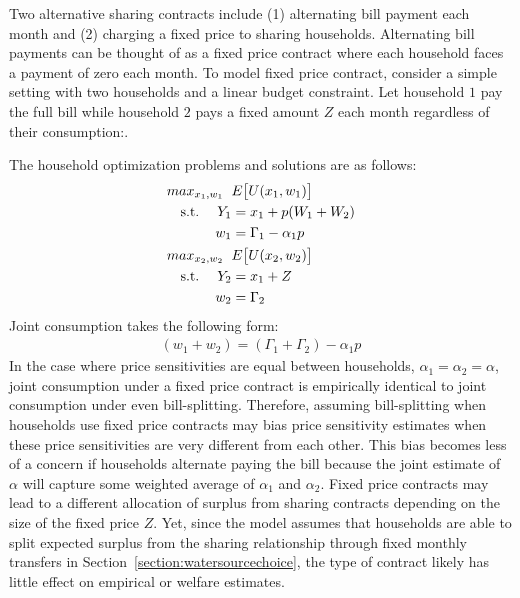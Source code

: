 \documentclass[12pt]{article}
\begin{document}
\begin{appendices}
Two alternative sharing contracts include (1) alternating bill payment each month and (2) charging a fixed price to sharing households.  Alternating bill payments can be thought of as a fixed price contract where each household faces a payment of zero each month.  To model fixed price contract, consider a simple setting with two households and a linear budget constraint.  Let household $1$ pay the full bill while household $2$ pays a fixed amount $Z$ each month regardless of their consumption:.

The household optimization problems and solutions are as follows:
\begin{align*}
max_{x_1,w_1} \hspace{.2cm} & E\big[ U(x_1,w_1) \big] \\
\text{s.t.  }\hspace{.3cm} Y_1 &=   x_1  + p (W_1 + W_{2})  \\
w_1 &= \Gamma_1 - \alpha_1  p \\
max_{x_2,w_2} \hspace{.2cm} & E\big[ U(x_2,w_2) \big] \\
\text{s.t.  }\hspace{.3cm} Y_2 &=   x_1  + Z \\
w_2 &= \Gamma_2
\end{align*}
Joint consumption takes the following form:
\begin{align*}
(w_1+w_2) = (\Gamma_1 + \Gamma_2) - \alpha_1 p
\end{align*}
In the case where price sensitivities are equal between households, $\alpha_1=\alpha_2=\alpha$, joint consumption under a fixed price contract is empirically identical to joint consumption under even bill-splitting.  Therefore, assuming bill-splitting when households use fixed price contracts may bias price sensitivity estimates when these price sensitivities are very different from each other.  This bias becomes less of a concern if households alternate paying the bill because the joint estimate of $\alpha$ will capture some weighted average of $\alpha_1$ and $\alpha_2$.  Fixed price contracts may lead to a different allocation of surplus from sharing contracts depending on the size of the fixed price $Z$.  Yet, since the model assumes that households are able to split expected surplus from the sharing relationship through fixed monthly transfers in Section~\ref{section:watersourcechoice}, the type of contract likely has little effect on empirical or welfare estimates.





\end{appendices}
\end{document}
